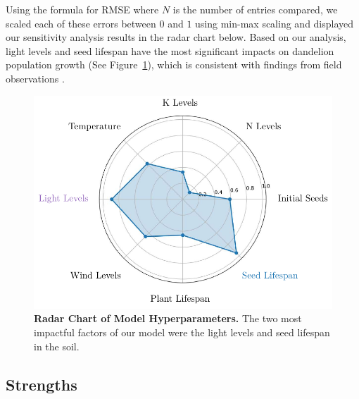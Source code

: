 Using the formula for RMSE where \(N\) is the number of entries compared, we scaled each of these errors between \(0\) and \(1\) using min-max scaling and displayed our sensitivity analysis results in the radar chart below. Based on our analysis, light levels and seed lifespan have the most significant impacts on dandelion population growth (See Figure~\ref{fig:radarchart1}), which is consistent with findings from field observations \cite{chepil_germination_1946}.

\begin{figure}[h!]
\centering
    \includegraphics[scale=0.6]{figures/radarchart1.pdf}
    \captionsetup{width=0.9\textwidth}
    \caption{\textbf{Radar Chart of Model Hyperparameters.} The two most impactful factors of our model were the light levels and seed lifespan in the soil.} 
    \label{fig:radarchart1}
\end{figure}

\subsection{Strengths}

